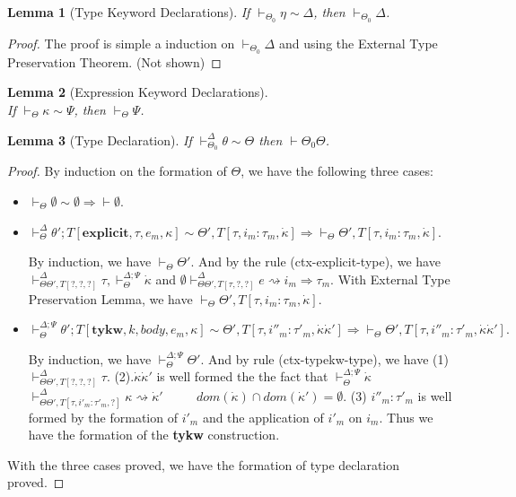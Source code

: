 \documentclass{sig-alternate}
\newcommand{\myvdash}{\vdash_{\Theta}^{\Delta;\Psi}}
\newtheorem{lemma}{Lemma}
\begin{document}
\begin{lemma}[Type Keyword Declarations] 
If $\vdash_{\Theta_0}\eta\sim\Delta$, then $\vdash_{\Theta_0}\Delta$.
\end{lemma}
\begin{proof}
The proof is simple a induction on $\vdash_{\Theta_0}\Delta$ and using the External Type Preservation Theorem. (Not shown)
\end{proof}

\begin{lemma}[Expression Keyword Declarations]\  \\
If $\vdash_{\Theta}\kappa\sim\Psi$, then $\vdash_{\Theta}\Psi$.
\end{lemma}

\begin{lemma}[Type Declaration]
If $\vdash_{\Theta_0}^{\Delta}\theta\sim\Theta$ then $\vdash\Theta_0\Theta$.
\end{lemma}
\begin{proof}
By induction on the formation of $\Theta$, we have the following three cases:
\begin{itemize}
\item $\vdash_{\Theta}\emptyset\sim\emptyset \Longrightarrow \vdash{\emptyset}$.
\item ${\vdash^{\Delta}_{\Theta}} \theta';T[\mathbf{explicit},\tau,e_m,\kappa] \sim \Theta',T[\tau,i_m:\tau_m,\dot\kappa] \Longrightarrow \vdash_{\Theta}\Theta',T[\tau,i_m:\tau_m,\dot{\kappa}]$. 

By induction, we have $\vdash_{\Theta}\Theta'$. And by the rule (ctx-explicit-type), we have $\vdash_{\Theta\Theta',T[?,?,?]}^{\Delta}\tau, \myvdash\dot\kappa$ and $\emptyset\vdash_{\Theta\Theta',T[\tau,?,?]}^{\Delta}e\rightsquigarrow i_m\Rightarrow\tau_m$. With External Type Preservation Lemma, we have $\vdash_{\Theta}\Theta',T[\tau,i_m:\tau_m,\dot{\kappa}]$.
\item $\myvdash \theta';T[\mathbf{tykw},k,body,e_m,\kappa] \sim \Theta',T[\tau,i''_m:\tau'_m,\dot{\kappa}\dot{\kappa}'] \Longrightarrow \vdash_{\Theta}\Theta',T[\tau,i''_m:\tau'_m,\dot{\kappa}\dot{\kappa}'].$

By induction, we have $\myvdash\Theta'$. And by rule (ctx-typekw-type), we have (1) $\vdash_{\Theta\Theta',T[?,?,?]}^{\Delta}\tau$. (2).$\dot\kappa\dot\kappa'$ is well formed the the fact that $\myvdash \dot\kappa$~~~~ $\vdash^{\Delta}_{\Theta\Theta',T[\tau,i'_m:\tau'_m,?]}\kappa\rightsquigarrow\dot{\kappa}'$ ~~~~ $dom(\dot{\kappa})\cap dom(\dot{\kappa}')=\emptyset$. (3) $i''_m:\tau'_m$ is well formed by the formation of $i'_m$ and the application of $i'_m$ on $i_m$. Thus we have the formation of the \textbf{tykw} construction.
\end{itemize}
With the three cases proved, we have the formation of type declaration proved.
\end{proof}
\end{document}
